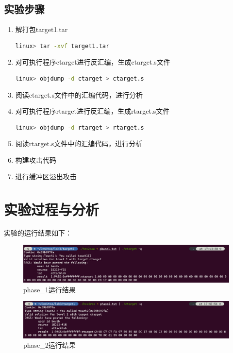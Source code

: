 \documentclass{article}
\begin{document}
\subsection{实验步骤}
\large
\begin{enumerate}[1)]
  \item 解打包target1.tar
        \begin{lstlisting}[language=bash]
    linux> tar -xvf target1.tar
    \end{lstlisting}
  \item 对可执行程序ctarget进行反汇编，生成ctarget.s文件
        \begin{lstlisting}[language=bash]
    linux> objdump -d ctarget > ctarget.s
    \end{lstlisting}
  \item 阅读ctarget.s文件中的汇编代码，进行分析
  \item 对可执行程序rtarget进行反汇编，生成rtarget.s文件
        \begin{lstlisting}[language=bash]
    linux> objdump -d rtarget > rtarget.s
    \end{lstlisting}
  \item 阅读rtarget.s文件中的汇编代码，进行分析
  \item 构建攻击代码
  \item 进行缓冲区溢出攻击
\end{enumerate}
\normalsize
\section{实验过程与分析}
\large

实验的运行结果如下：
\begin{figure}[H]
  \centering
  \includegraphics[width=17cm]{phase1.png}
  \caption{phase\_1运行结果}
\end{figure}

\begin{figure}[H]
  \centering
  \includegraphics[width=17cm]{phase2.png}
  \caption{phase\_2运行结果}
\end{figure}
\end{document}
